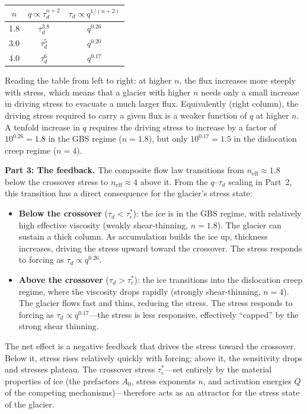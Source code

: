 \documentclass[11pt]{article}
\begin{document}
\begin{center}
\begin{tabular}{ccc}
\toprule
$n$ & $q \propto \tau_d^{n+2}$ & $\tau_d \propto q^{1/(n+2)}$ \\
\midrule
1.8 & $\tau_d^{3.8}$ & $q^{0.26}$ \\
3.0 & $\tau_d^{5}$ & $q^{0.20}$ \\
4.0 & $\tau_d^{6}$ & $q^{0.17}$ \\
\bottomrule
\end{tabular}
\end{center}

\noindent Reading the table from left to right: at higher $n$, the flux increases more steeply with stress, which means that a glacier with higher $n$ needs only a small increase in driving stress to evacuate a much larger flux.  Equivalently (right column), the driving stress required to carry a given flux is a weaker function of $q$ at higher $n$.  A tenfold increase in $q$ requires the driving stress to increase by a factor of $10^{0.26} = 1.8$ in the GBS regime ($n = 1.8$), but only $10^{0.17} = 1.5$ in the dislocation creep regime ($n = 4$).

\medskip
\noindent\textbf{Part 3: The feedback.}  The composite flow law transitions from $n_{\text{eff}} \approx 1.8$ below the crossover stress to $n_{\text{eff}} \approx 4$ above it.  From the $q$--$\tau_d$ scaling in Part~2, this transition has a direct consequence for the glacier's stress state:

\begin{itemize}
  \item \textbf{Below the crossover} ($\tau_d < \tau_e^*$): the ice is in the GBS regime, with relatively high effective viscosity (weakly shear-thinning, $n = 1.8$).  The glacier can sustain a thick column.  As accumulation builds the ice up, thickness increases, driving the stress upward toward the crossover.  The stress responds to forcing as $\tau_d \propto q^{0.26}$.
  \item \textbf{Above the crossover} ($\tau_d > \tau_e^*$): the ice transitions into the dislocation creep regime, where the viscosity drops rapidly (strongly shear-thinning, $n = 4$).  The glacier flows fast and thins, reducing the stress.  The stress responds to forcing as $\tau_d \propto q^{0.17}$---the stress is less responsive, effectively ``capped'' by the strong shear thinning.
\end{itemize}

\noindent The net effect is a negative feedback that drives the stress toward the crossover.  Below it, stress rises relatively quickly with forcing; above it, the sensitivity drops and stresses plateau.  The crossover stress $\tau_e^*$---set entirely by the material properties of ice (the prefactors $A_0$, stress exponents $n$, and activation energies $Q$ of the competing mechanisms)---therefore acts as an attractor for the stress state of the glacier.
\end{document}
